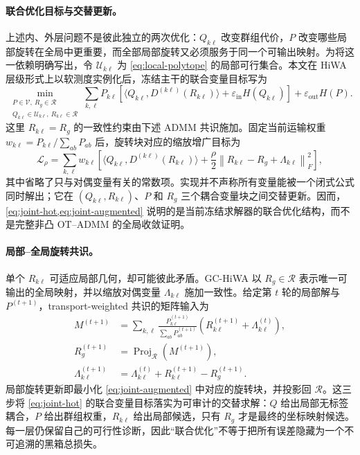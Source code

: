 \documentclass[10pt,a4paper,fontset=windows]{ctexart}
\newcommand{\norm}[1]{\left\lVert #1\right\rVert}
\newcommand{\Proj}{\operatorname{Proj}}
\theoremstyle{definition}
\theoremstyle{remark}
\begin{document}
\paragraph{联合优化目标与交替更新。} 上述内、外层问题不是彼此独立的两次优化：$Q_{k\ell}$ 改变群组代价，$P$ 改变哪些局部旋转在全局中更重要，而全部局部旋转又必须服务于同一个可输出映射。为将这一依赖明确写出，令 $\mathcal U_{k\ell}$ 为 \cref{eq:local-polytope} 的局部可行集合。本文在 HiWA 层级形式上以软测度实例化后，冻结主干的联合变量目标写为
\begin{equation}
\min_{\substack{P\in\mathcal V,\ R_g\in\mathcal R\\ Q_{k\ell}\in\mathcal U_{k\ell},\ R_{k\ell}\in\mathcal R}}
\sum_{k,\ell}P_{k\ell}\left[
\langle Q_{k\ell},D^{(k\ell)}(R_{k\ell})\rangle+
\varepsilon_{\mathrm{in}}H(Q_{k\ell})\right]
+\varepsilon_{\mathrm{out}}H(P).
\label{eq:joint-hot}
\end{equation}
这里 $R_{k\ell}=R_g$ 的一致性约束由下述 ADMM 共识施加。固定当前运输权重 $w_{k\ell}=P_{k\ell}/\sum_{ab}P_{ab}$ 后，旋转块对应的缩放增广目标为
\begin{equation}
\mathcal L_\rho=
\sum_{k,\ell}w_{k\ell}\left[
\langle Q_{k\ell},D^{(k\ell)}(R_{k\ell})\rangle+
\frac{\rho}{2}\norm{R_{k\ell}-R_g+\Lambda_{k\ell}}_F^2\right],
\label{eq:joint-augmented}
\end{equation}
其中省略了只与对偶变量有关的常数项。实现并不声称所有变量能被一个闭式公式同时解出；它在 $(Q_{k\ell},R_{k\ell})$、$P$ 和 $R_g$ 三个耦合变量块之间交替更新。因而，\cref{eq:joint-hot,eq:joint-augmented} 说明的是当前冻结求解器的联合优化结构，而不是完整非凸 OT--ADMM 的全局收敛证明。

\paragraph{局部--全局旋转共识。} 单个 $R_{k\ell}$ 可适应局部几何，却可能彼此矛盾。GC-HiWA 以 $R_g\in\mathcal R$ 表示唯一可输出的全局映射，并以缩放对偶变量 $\Lambda_{k\ell}$ 施加一致性。给定第 $t$ 轮的局部解与 $P^{(t+1)}$，transport-weighted 共识的矩阵输入为
\begin{align}
M^{(t+1)}&=\sum_{k,\ell}\frac{P_{k\ell}^{(t+1)}}{\sum_{ab}P_{ab}^{(t+1)}}
\left(R_{k\ell}^{(t+1)}+\Lambda_{k\ell}^{(t)}\right),\\
R_g^{(t+1)}&=\Proj_{\mathcal R}\left(M^{(t+1)}\right),\\
\Lambda_{k\ell}^{(t+1)}&=\Lambda_{k\ell}^{(t)}+R_{k\ell}^{(t+1)}-R_g^{(t+1)}.
\label{eq:admm-consensus}
\end{align}
局部旋转更新即最小化 \cref{eq:joint-augmented} 中对应的旋转块，并投影回 $\mathcal R$。这三步将 \cref{eq:joint-hot} 的联合变量目标落实为可审计的交替求解：$Q$ 给出局部无标签耦合，$P$ 给出群组权重，$R_{k\ell}$ 给出局部候选，只有 $R_g$ 才是最终的坐标映射候选。每一层仍保留自己的可行性诊断，因此“联合优化”不等于把所有误差隐藏为一个不可追溯的黑箱总损失。
\end{document}
